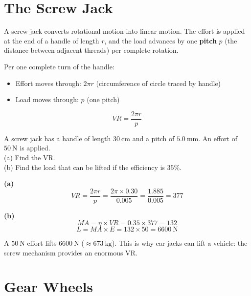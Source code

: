 \section{The Screw Jack}

\begin{processbox}
A screw jack converts rotational motion into linear
motion. The effort is applied at the end of a handle
of length $r$, and the load advances by one
\textbf{pitch} $p$ (the distance between adjacent
threads) per complete rotation.

Per one complete turn of the handle:
\begin{itemize}[noitemsep]
  \item Effort moves through: $2\pi r$ (circumference
  of circle traced by handle)
  \item Load moves through: $p$ (one pitch)
\end{itemize}
\[
  VR = \frac{2\pi r}{p}
\]
\end{processbox}

\begin{examplebox}[10.6]
A screw jack has a handle of length $30\ \text{cm}$
and a pitch of $5.0\ \text{mm}$. An effort of
$50\ \text{N}$ is applied.\\
(a) Find the VR.\\
(b) Find the load that can be lifted if the
efficiency is $35\%$.
\end{examplebox}

\begin{solutionbox}
\textbf{(a)}
\[
  VR = \frac{2\pi r}{p}
  = \frac{2\pi \times 0.30}{0.005}
  = \frac{1.885}{0.005} = 377
\]

\textbf{(b)}
\[
  MA = \eta \times VR = 0.35 \times 377 = 132
\]
\[
  L = MA \times E = 132 \times 50 = 6600\ \text{N}
\]

A $50\ \text{N}$ effort lifts $6600\ \text{N}$
($\approx 673\ \text{kg}$). This is why car jacks
can lift a vehicle: the screw mechanism provides
an enormous VR.
\end{solutionbox}

\section{Gear Wheels}

